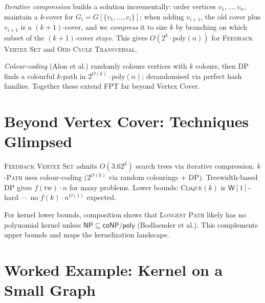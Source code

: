 \emph{Iterative compression} builds a solution incrementally: order vertices $v_1,\dots,v_n$, maintain a $k$-cover for $G_i=G[\{v_1,\dots,v_i\}]$; when adding $v_{i+1}$, the old cover plus $v_{i+1}$ is a $(k+1)$-cover, and we \emph{compress} it to size $k$ by branching on which subset of the $(k+1)$-cover stays. This gives $O(2^k\cdot\text{poly}(n))$ for \textsc{Feedback Vertex Set} and \textsc{Odd Cycle Transversal}.

\emph{Colour-coding} (Alon et al.) randomly colours vertices with $k$ colours, then DP finds a colourful $k$-path in $2^{O(k)}\cdot\text{poly}(n)$; derandomised via perfect hash families. Together these extend FPT far beyond Vertex Cover.

\section{Beyond Vertex Cover: Techniques Glimpsed}
\label{sec:beyond-vc}

\textsc{Feedback Vertex Set} admits $O(3.62^k)$ search trees via iterative compression. \textsc{$k$-Path} uses colour-coding ($2^{O(k)}$ via random colourings + DP). Treewidth-based DP gives $f(\text{tw})\cdot n$ for many problems. Lower bounds: \textsc{Clique}$(k)$ is $\mathsf{W}[1]$-hard --- no $f(k)\cdot n^{O(1)}$ expected.

For kernel lower bounds, composition shows that \textsc{Longest Path} likely has no polynomial kernel unless $\mathsf{NP}\subseteq\mathsf{coNP/poly}$ (Bodlaender et al.). This complements upper bounds and maps the kernelization landscape.


\section{Worked Example: Kernel on a Small Graph}
\label{sec:kernel-example}

